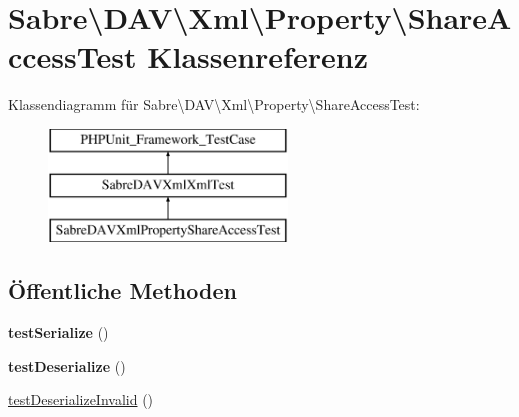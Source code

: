 \hypertarget{class_sabre_1_1_d_a_v_1_1_xml_1_1_property_1_1_share_access_test}{}\section{Sabre\textbackslash{}D\+AV\textbackslash{}Xml\textbackslash{}Property\textbackslash{}Share\+Access\+Test Klassenreferenz}
\label{class_sabre_1_1_d_a_v_1_1_xml_1_1_property_1_1_share_access_test}
Klassendiagramm für Sabre\textbackslash{}D\+AV\textbackslash{}Xml\textbackslash{}Property\textbackslash{}Share\+Access\+Test\+:\begin{figure}[H]
\begin{center}
\leavevmode
\includegraphics[height=3.000000cm]{class_sabre_1_1_d_a_v_1_1_xml_1_1_property_1_1_share_access_test}
\end{center}
\end{figure}
\subsection*{Öffentliche Methoden}
\begin{DoxyCompactItemize}
\item 
\mbox{\label{class_sabre_1_1_d_a_v_1_1_xml_1_1_property_1_1_share_access_test_a95705c136c6f9a27a566f07eb8806376}} 
{\bfseries test\+Serialize} ()
\item 
\mbox{\label{class_sabre_1_1_d_a_v_1_1_xml_1_1_property_1_1_share_access_test_a44b82dd0fab5e243125b5b179bcf4cd4}} 
{\bfseries test\+Deserialize} ()
\item 
\mbox{\hyperlink{class_sabre_1_1_d_a_v_1_1_xml_1_1_property_1_1_share_access_test_a72ce4fafcb23e004751e8ccc38686df4}{test\+Deserialize\+Invalid}} ()
\end{DoxyCompactItemize}

